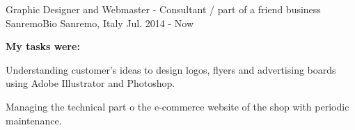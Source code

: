 {\begin{cventries}
  \cventry
  {Graphic Designer and Webmaster - Consultant / part of a friend business} %
  {SanremoBio} %
  {Sanremo, Italy} %
  {Jul. 2014 - Now} %
  {
    \begin{cvparagraph}
      \textbf{My tasks were:}
    \end{cvparagraph}
    \begin{cvitems} %
      \item {Understanding customer's ideas to design logos, flyers and advertising boards using Adobe Illustrator and Photoshop.}
      \item {Managing the technical part o the e-commerce website of the shop with periodic maintenance.}
    \end{cvitems}
  }
\end{cventries}
}